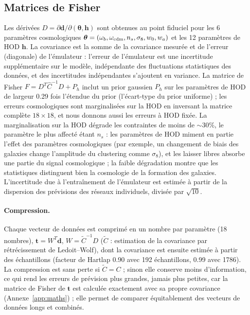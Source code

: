 \subsection{Matrices de Fisher}
\label{sec:fishermat}

Les dérivées $D=\partial\boldsymbol d/\partial(\boldsymbol\theta,\boldsymbol h)$ sont obtenues au point fiduciel pour les 6 paramètres cosmologiques $\boldsymbol\theta=(\omega_b,\omega_{\rm cdm},n_s,\sigma_8,w_0,w_a)$ et les 12 paramètres de HOD $\boldsymbol h$. La covariance est la somme de la covariance mesurée et de l'erreur (diagonale) de l'émulateur : l'erreur de l'émulateur est une incertitude supplémentaire sur le modèle, indépendante des fluctuations statistiques des données, et des incertitudes indépendantes s'ajoutent en variance. La matrice de Fisher $F = D^T\hat C^{-1}D + P_h$ inclut un prior gaussien $P_h$ sur les paramètres de HOD de largeur 0.29 fois l'étendue du prior (l'écart-type du prior uniforme) ; les erreurs cosmologiques sont marginalisées sur la HOD en inversant la matrice complète $18\times18$, et nous donnons aussi les erreurs à HOD fixée. La marginalisation sur la HOD dégrade les contraintes de moins de $\sim30\%$, le paramètre le plus affecté étant $n_s$ : les paramètres de HOD miment en partie l'effet des paramètres cosmologiques (par exemple, un changement de biais des galaxies change l'amplitude du clustering comme $\sigma_8$), et les laisser libres absorbe une partie du signal cosmologique ; la faible dégradation montre que les statistiques distinguent bien la cosmologie de la formation des galaxies. L'incertitude due à l'entraînement de l'émulateur est estimée à partir de la dispersion des prévisions des réseaux individuels, divisée par $\sqrt{10}$.

\paragraph{Compression.} Chaque vecteur de données est comprimé en un nombre par paramètre (18 nombres), $\boldsymbol t=W^T\boldsymbol d$, $W=\tilde C^{-1}D$ ($\tilde C$ : estimation de la covariance par rétrécissement de Ledoit--Wolf), dont la covariance est ensuite estimée à partir des échantillons (facteur de Hartlap 0.90 avec 192 échantillons, 0.99 avec 1786). La compression est sans perte si $\tilde C=C$ ; sinon elle conserve moins d'information, ce qui rend les erreurs de prévision plus grandes, jamais plus petites, car la matrice de Fisher de $\boldsymbol t$ est calculée exactement avec sa propre covariance (Annexe~\ref{app:maths}) ; elle permet de comparer équitablement des vecteurs de données longs et combinés.

